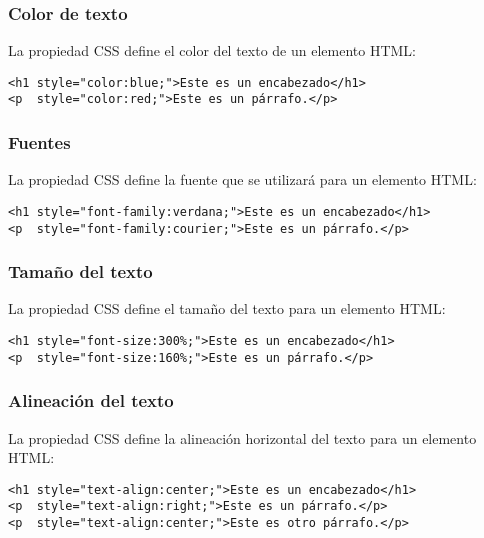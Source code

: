 \begin{frame}[fragile]
  \frametitle{Color de texto}

  La propiedad CSS  define el color del
  texto de un elemento HTML:

  \vspace{\baselineskip}
  \begin{lstlisting}
<h1 style="color:blue;">Este es un encabezado</h1>
<p  style="color:red;">Este es un párrafo.</p>
  \end{lstlisting}
\end{frame}

\begin{frame}[fragile]
  \frametitle{Fuentes}

  La propiedad CSS  define la fuente
  que se utilizará para un elemento HTML:

  \vspace{\baselineskip}
  \begin{lstlisting}
<h1 style="font-family:verdana;">Este es un encabezado</h1>
<p  style="font-family:courier;">Este es un párrafo.</p>
  \end{lstlisting}
\end{frame}

\begin{frame}[fragile]
  \frametitle{Tamaño del texto}

  La propiedad CSS  define el
  tamaño del texto para un elemento HTML:

  \vspace{\baselineskip}
  \begin{lstlisting}
<h1 style="font-size:300%;">Este es un encabezado</h1>
<p  style="font-size:160%;">Este es un párrafo.</p>
  \end{lstlisting}
\end{frame}

\begin{frame}[fragile]
  \frametitle{Alineación del texto}

  La propiedad CSS  define la
  alineación horizontal del texto para un elemento HTML:

  \vspace{\baselineskip}
  \begin{lstlisting}
<h1 style="text-align:center;">Este es un encabezado</h1>
<p  style="text-align:right;">Este es un párrafo.</p>
<p  style="text-align:center;">Este es otro párrafo.</p>
  \end{lstlisting}
\end{frame}

